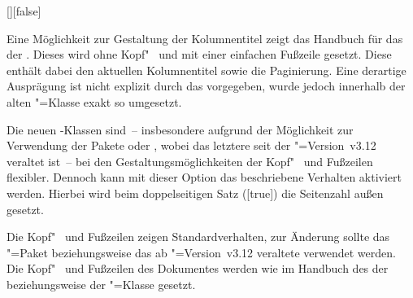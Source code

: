 \documentclass[%
  english,ngerman,%
  headings=optiontoheadandtoc,captions=tableheading,numbers=noenddot,%
  chapterpage,cdfoot,%
]{tudscrman}
\begin{document}
\begin{Declaration}{[\PBoolean]}[false]%
\printdeclarationlist%
%

Eine Möglichkeit zur Gestaltung der Kolumnentitel zeigt das Handbuch für das \CD 
der \TnUD. Dieses wird ohne Kopf"~ und mit einer einfachen Fußzeile gesetzt. 
Diese enthält dabei den aktuellen Kolumnentitel sowie die Paginierung. Eine 
derartige Ausprägung ist nicht explizit durch das \CD vorgegeben, wurde jedoch 
innerhalb der alten "=Klasse exakt so umgesetzt.

Die neuen \TUDScript-Klassen sind~-- insbesondere aufgrund der Möglichkeit zur 
Verwendung der Pakete  oder , wobei 
das letztere seit der \KOMAScript"=Version~v3.12 veraltet ist~-- bei den 
Gestaltungsmöglichkeiten der Kopf"~ und Fußzeilen flexibler. Dennoch kann mit 
dieser Option das beschriebene Verhalten aktiviert werden. Hierbei wird beim 
doppelseitigen Satz ([true]) die Seitenzahl außen gesetzt.
%
\begin{values}
\itemfalse
  Die Kopf"~ und Fußzeilen zeigen Standardverhalten, zur Änderung sollte das
  \KOMAScript"=Paket  beziehungsweise das ab 
  \KOMAScript"=Version~v3.12 veraltete  verwendet werden.
\itemtrue*
  Die Kopf"~ und Fußzeilen des Dokumentes werden wie im Handbuch des \CDs der 
  \TnUD beziehungsweise der "=Klasse gesetzt.
\end{values}
\end{Declaration}
\end{document}
